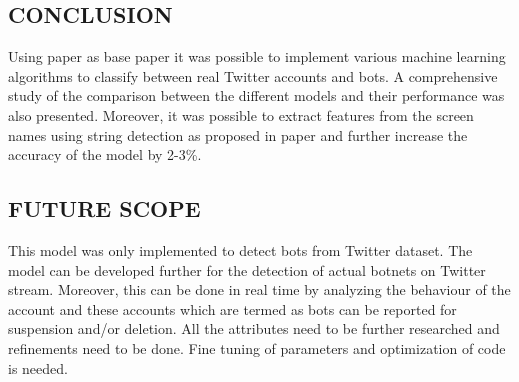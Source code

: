 \documentclass[a4paper, 12pt]{article}
\begin{document}
\newpage
\begin{center}
\section{CONCLUSION}
\end{center}
\par
\hspace{1cm}
Using paper \cite{paper1} as base paper it was possible to implement various machine learning algorithms to classify between real Twitter accounts and bots. A comprehensive study of the comparison between the different models and their performance was also presented. Moreover, it was possible to extract features from the screen names using string detection as proposed in paper \cite{paper3} and further increase the accuracy of the model by 2-3\%.
\\
\begin{center}
\section{FUTURE SCOPE}
\end{center}
\par
\hspace{1cm}
This model was only implemented to detect bots from Twitter dataset. The model can be developed further for the detection of actual botnets on Twitter stream. Moreover, this can be done in real time by analyzing the behaviour of the account and these accounts which are termed as bots can be reported for suspension and/or deletion. All the attributes need to be further researched and reﬁnements need to be done.
Fine tuning of parameters and optimization of code is needed.
\newpage


\end{document}
